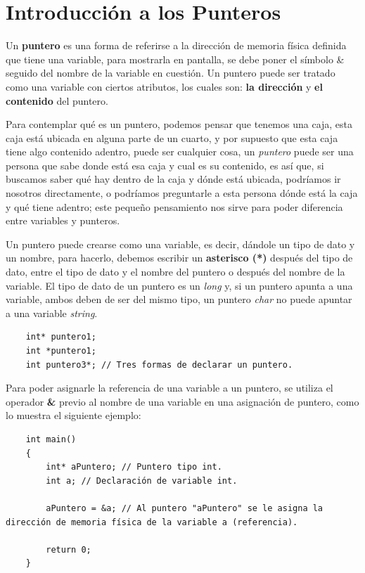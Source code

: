 \section{Introducción a los Punteros}
\hspace{0.55cm}Un \textbf{puntero} es una forma de referirse a la dirección de memoria física definida que tiene una variable, para mostrarla en pantalla, se debe poner el símbolo \& seguido del nombre de la variable en cuestión. Un puntero puede ser tratado como una variable con ciertos atributos, los cuales son: \textbf{la dirección} y \textbf{el contenido} del puntero.

Para contemplar qué es un puntero, podemos pensar que tenemos una caja, esta caja está ubicada en alguna parte de un cuarto, y por supuesto que esta caja tiene algo contenido adentro, puede ser cualquier cosa, un \textit{puntero} puede ser una persona que sabe donde está esa caja y cual es su contenido, es así que, si buscamos saber qué hay dentro de la caja y dónde está ubicada, podríamos ir nosotros directamente, o podríamos preguntarle a esta persona dónde está la caja y qué tiene adentro; este pequeño pensamiento nos sirve para poder diferencia entre variables y punteros.

Un puntero puede crearse como una variable, es decir, dándole un tipo de dato y un nombre, para hacerlo, debemos escribir un \textbf{asterisco (*)} después del tipo de dato, entre el tipo de dato y el nombre del puntero o después del nombre de la variable. El tipo de dato de un puntero es un \textit{long} y, si un puntero apunta a una variable, ambos deben de ser del mismo tipo, un puntero \textit{char} no puede apuntar a una variable \textit{string}.
\begin{lstlisting}
    int* puntero1;
    int *puntero1;
    int puntero3*; // Tres formas de declarar un puntero.
\end{lstlisting}

Para poder asignarle la referencia de una variable a un puntero, se utiliza el operador \textbf{\&} previo al nombre de una variable en una asignación de puntero, como lo muestra el siguiente ejemplo:
\begin{lstlisting}
    int main()
    {
        int* aPuntero; // Puntero tipo int.
        int a; // Declaración de variable int.
        
        aPuntero = &a; // Al puntero "aPuntero" se le asigna la dirección de memoria física de la variable a (referencia).
    
        return 0;
    }
\end{lstlisting}

